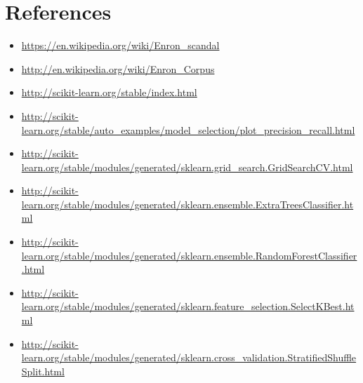 \documentclass[12pt]{article}%
\begin{document}
\newpage
\section*{References}
\begin{itemize}
  \item \url{https://en.wikipedia.org/wiki/Enron_scandal	}
  
  \item \url{http://en.wikipedia.org/wiki/Enron_Corpus}

  \item \url{http://scikit-learn.org/stable/index.html} 
  
  \item \url{http://scikit-learn.org/stable/auto_examples/model_selection/plot_precision_recall.html}

  \item \url{http://scikit-learn.org/stable/modules/generated/sklearn.grid_search.GridSearchCV.html}
  
  \item \url{http://scikit-learn.org/stable/modules/generated/sklearn.ensemble.ExtraTreesClassifier.html}
  
  \item \url{http://scikit-learn.org/stable/modules/generated/sklearn.ensemble.RandomForestClassifier.html}
  
  \item \url{http://scikit-learn.org/stable/modules/generated/sklearn.feature_selection.SelectKBest.html}
  
  \item \url{http://scikit-learn.org/stable/modules/generated/sklearn.cross_validation.StratifiedShuffleSplit.html}
  
 \end{itemize}
\end{document}
